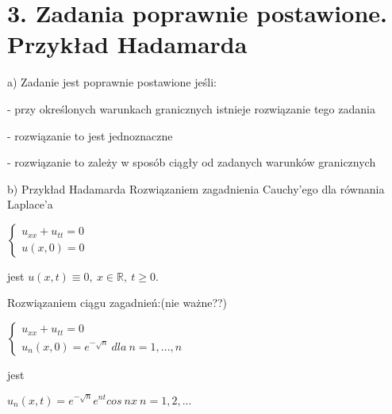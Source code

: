 \section{3. Zadania poprawnie postawione. Przykład Hadamarda}

a) Zadanie jest poprawnie postawione jeśli:

  - przy określonych warunkach granicznych istnieje rozwiązanie tego zadania
  
  - rozwiązanie to jest jednoznaczne

  - rozwiązanie to zależy w sposób ciągły od zadanych warunków granicznych

b) Przykład Hadamarda
Rozwiązaniem zagadnienia Cauchy'ego dla równania Laplace'a

$\left\{\begin{matrix} u_{xx} + u_{tt} = 0 \\ u(x,0) = 0 \end{matrix}\right.$

jest $u(x,t) \equiv 0,\ x \in \mathbb{R},\ t \geqslant 0$.

Rozwiązaniem ciągu zagadnień:(nie ważne??)

$\left\{\begin{matrix} u_{xx} + u_{tt} = 0 \\ u_n(x,0) = e^{-\sqrt{n}}\ dla\ n = 1, ..., n \end{matrix}\right.$

jest

$u_n(x,t) = e^{-\sqrt{n}}e^{nt}cos\ nx\  n = 1, 2, ...$


